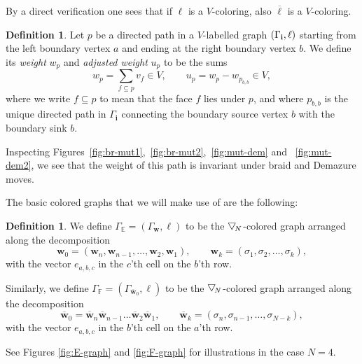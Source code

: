\documentclass[11pt, reqno]{amsart}
\theoremstyle{definition}
\newtheorem{defn}[theorem]{Definition}
\numberwithin{equation}{section}
\newcommand{\btd}[1]{\raisebox{\depth}{$\bigtriangledown$\!}_{#1}}
\begin{document}
By a direct verification one sees that if $\ell$ is a $V$-coloring, also $\overline{\ell}$ is a $V$-coloring. 

\begin{defn}
Let $p$ be a directed path in a $V$-labelled graph $(\Gamma_{\bf i},\ell)$ starting from the left boundary vertex $a$ and ending at the right boundary vertex $b$. We define its \emph{weight} $w_p$ and \emph{adjusted weight} $u_p$ to be the sums
\begin{equation}
w_p=\sum_{f\subseteq p} v_f\in V,\qquad u_p = w_p - w_{p_{b,b}} \in V,
\end{equation}
where we write $f \subseteq p$ to mean that the face $f$ lies under $p$, and where $p_{b,b}$ is the unique directed path in $\Gamma_{\mathbf{i}}$ connecting the boundary source vertex $b$ with the boundary sink $b$.
\end{defn}
Inspecting Figures~\ref{fig:br-mut1},~\ref{fig:br-mut2},~\ref{fig:mut-dem} and ~\ref{fig:mut-dem2}, we see that the weight of this path is invariant under braid and Demazure moves.

The basic colored graphs that we will make use of are the following: 

\begin{defn}
We define $\Gamma_{\mathbb{E}} = (\Gamma_{\mathbf{w}},\ell)$ to be the $\btd{N}$-colored graph arranged along the decomposition 
\begin{equation}\label{EqLongestWord1}
\mathbf{w}_0 = (\mathbf{w}_n,\mathbf{w}_{n-1},\ldots,\mathbf{w}_2,\mathbf{w}_1),\qquad \mathbf{w}_k = (\sigma_1,\sigma_{2},\ldots,\sigma_{k}),
\end{equation}
with the vector $e_{a,b,c}$ in the $c$'th cell on the $b$'th row.

Similarly, we define $\Gamma_{\mathbb{F}} = (\Gamma_{\overline{\mathbf{w}}_0},\ell)$ to be the $\btd{N}$-colored graph arranged along the decomposition 
\begin{equation}\label{EqLongestWord2}
\overline{\mathbf{w}}_0 = \overline{\mathbf{w}}_n\overline{\mathbf{w}}_{n-1}\ldots \overline{\mathbf{w}}_2\overline{\mathbf{w}}_1,\qquad \overline{\mathbf{w}}_k = (\sigma_n,\sigma_{n-1},\ldots,\sigma_{N-k}),
\end{equation}
with the vector $e_{a,b,c}$ in the $b$'th cell on the $a$'th row.
\end{defn}

See Figures \ref{fig:E-graph} and \ref{fig:F-graph} for illustrations in the case $N=4$. 
\end{document}
